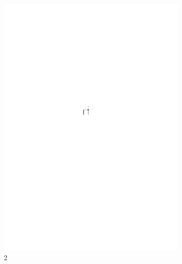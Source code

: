 \documentclass{beamer}
\begin{document}
\begin{frame}
\begin{columns}[b]
\begin{column}{2cm}
\begin{figure}[h]
                \includegraphics[scale=.8]{oc3_embed/incoming/indeg2}
                \caption{2}
        \end{figure}
\end{column}
\begin{column}{2cm}
        \begin{figure}[h]
                \centering

\end{figure}
\end{column}
\end{columns}
\end{frame}
\end{document}
